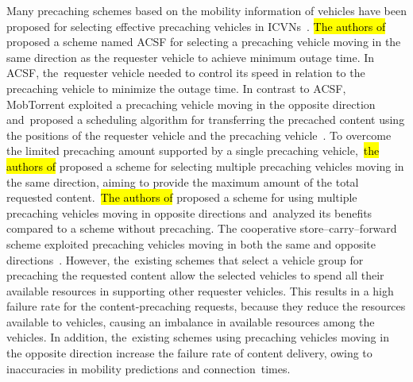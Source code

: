 \documentclass[sensors,aricle,accept,pdftex,moreauthors]{Definitions/mdpi}
\begin{document}
Many precaching schemes based on the mobility information of vehicles have been proposed for selecting effective precaching vehicles in ICVNs~\cite{Wu2013, Chen2009, Ahmed2018, Guo2017, Wang2017}. \hl{The authors of}     
\cite{Wu2013} %
proposed a scheme named ACSF for selecting a precaching vehicle moving in the same direction as the requester vehicle to achieve minimum outage time.
In ACSF, the~requester vehicle needed to control its speed in relation to the precaching vehicle to minimize the outage time.
In contrast to ACSF, MobTorrent exploited a precaching vehicle moving in the opposite direction and~proposed a scheduling algorithm for transferring the precached content using the positions of the requester vehicle and the precaching vehicle~\cite{Chen2009}.
To overcome the limited precaching amount supported by a single precaching vehicle,~\hl{the authors of} \cite{Ahmed2018} %
proposed a scheme for selecting multiple precaching vehicles moving in the same direction, aiming to provide the maximum amount of the total requested content.~\hl{The authors of} \cite{Guo2017} %
proposed a scheme for using multiple precaching vehicles moving in opposite directions and~analyzed its benefits compared to a scheme without precaching.
The cooperative store--carry--forward scheme exploited precaching vehicles moving in both the same and opposite directions~\cite{Wang2017}.
However, the~existing schemes that {select a vehicle group} for precaching the requested content allow the selected vehicles to spend all their available resources in supporting other requester vehicles.
This results in a high failure rate for the content-precaching requests, because they reduce the resources available to vehicles, 
causing an imbalance in available resources among the vehicles.
In addition, the~existing schemes using precaching vehicles moving in the opposite direction increase the failure rate of content delivery, owing to inaccuracies in mobility predictions and connection~times.
\end{document}
